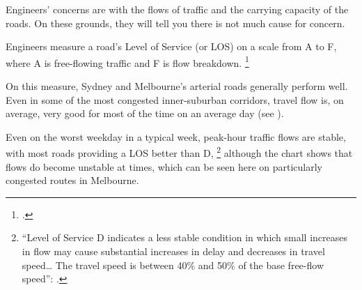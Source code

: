 
Engineers' concerns are with the flows of traffic and the carrying capacity of the roads.
On these grounds, they will tell you there is not much cause for concern.

Engineers measure a road's Level of Service (or LOS) on a scale from A to F, where A is free-flowing traffic and F is flow breakdown.%
    \footcite[][Part~3: Traffic Studies and Analysis, p.~63]{Austroads-2015-Guide-Traffic-Mgmt}

On this measure, Sydney and Melbourne's arterial roads generally perform well. Even in some of the most congested inner-suburban corridors, travel flow is, on average, very good for most of the time on an average day
(see ).

Even on the worst weekday in a typical week, peak-hour traffic flows are stable, with most roads providing a LOS better than D,%
    \footnote{``Level of Service D indicates a less stable condition in which small increases in flow may cause substantial increases in delay and decreases in travel speed\dots{} The travel speed is between 40\% and 50\% of the base free-flow speed'': \textcite[][Part~3, p.~63]{Austroads-2015-Guide-Traffic-Mgmt}.}
although the chart shows that flows do become unstable at times, which can be seen here on particularly congested routes in Melbourne.


